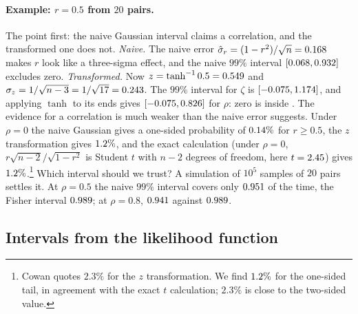 \paragraph{Example: $r=0.5$ from $20$ pairs.}
The point first: the naive Gaussian interval claims a correlation, and the
transformed one does not. \emph{Naive.} The naive error
$\hat\sigma_r=(1-r^2)/\sqrt n=0.168$ makes $r$ look like a three-sigma
effect, and the naive $99\%$ interval $[0.068,0.932]$
excludes zero. \emph{Transformed.} Now $z=\tanh^{-1}0.5=0.549$ and
$\sigma_z=1/\sqrt{n-3}=1/\sqrt{17}=0.243$. The $99\%$ interval for
$\zeta$ is $[-0.075,1.174]$, and applying $\tanh$ to its ends
gives $[-0.075,0.826]$ for $\rho$: zero is inside
. The evidence for a correlation is much weaker than the
naive error suggests. Under
$\rho=0$ the naive Gaussian gives a one-sided probability of
$0.14\%$ for $r\ge0.5$, the $z$ transformation gives
$1.2\%$, and the exact calculation (under $\rho=0$,
$r\sqrt{n-2}/\sqrt{1-r^2}$ is Student $t$ with $n-2$ degrees of freedom, here
$t=2.45$) gives $1.2\%$.\footnote{Cowan quotes $2.3\%$ for
the $z$ transformation. We find $1.2\%$ for the one-sided tail,
in agreement with the exact $t$ calculation; $2.3\%$ is close to the two-sided
value.} Which interval should we trust? A simulation of $10^5$ samples of $20$
pairs settles it. At $\rho=0.5$ the naive $99\%$ interval covers only
$0.951$ of the time, the Fisher interval $0.989$;
at $\rho=0.8$, $0.941$ against $0.989$.

\subsection{Intervals from the likelihood function}
\label{4b:sec:likelihood-interval}

